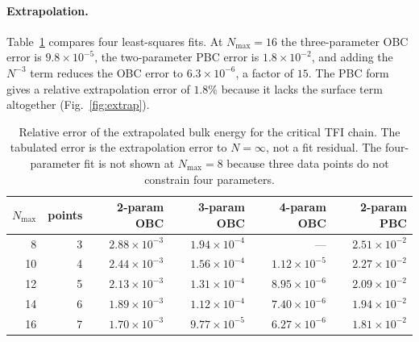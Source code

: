 \documentclass[pdflatex,sn-mathphys-num]{sn-jnl}
\begin{document}
\paragraph{Extrapolation.}
Table~\ref{tab:extrap} compares four least-squares fits. At
$N_{\max} = 16$ the three-parameter OBC error is
$9.8\times10^{-5}$, the two-parameter PBC error is
$1.8\times10^{-2}$, and adding the $N^{-3}$ term reduces the OBC
error to $6.3\times10^{-6}$, a factor of $15$. The PBC form gives a
relative extrapolation error of $1.8\%$ because it lacks the surface
term altogether (Fig.~\ref{fig:extrap}).

\begin{table}[t]
\centering
\small
\caption{Relative error of the extrapolated bulk energy for the
critical TFI chain. The tabulated error is the extrapolation error to
$N=\infty$, not a fit residual. The four-parameter fit is not shown
at $N_{\max}=8$ because three data points do not constrain four
parameters.}
\label{tab:extrap}
\begin{tabular}{rrrrrr}
\toprule
$N_{\max}$ & points & 2-param OBC & 3-param OBC & 4-param OBC & 2-param PBC \\
\midrule
8  & 3 & $2.88\times10^{-3}$ & $1.94\times10^{-4}$ & ---                 & $2.51\times10^{-2}$ \\
10 & 4 & $2.44\times10^{-3}$ & $1.56\times10^{-4}$ & $1.12\times10^{-5}$ & $2.27\times10^{-2}$ \\
12 & 5 & $2.13\times10^{-3}$ & $1.31\times10^{-4}$ & $8.95\times10^{-6}$ & $2.09\times10^{-2}$ \\
14 & 6 & $1.89\times10^{-3}$ & $1.12\times10^{-4}$ & $7.40\times10^{-6}$ & $1.94\times10^{-2}$ \\
16 & 7 & $1.70\times10^{-3}$ & $9.77\times10^{-5}$ & $6.27\times10^{-6}$ & $1.81\times10^{-2}$ \\
\bottomrule
\end{tabular}
\end{table}
\end{document}
